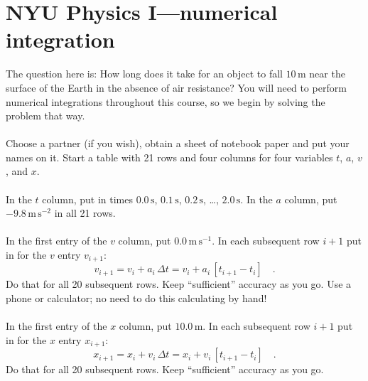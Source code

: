 \documentclass[12pt]{article}
\begin{document}
\newcommand{\m}{\mathrm{m}}
\newcommand{\s}{\mathrm{s}}
\newcommand{\mps}{\m\,\s^{-1}}
\newcommand{\mpss}{\m\,\s^{-2}}
\thispagestyle{empty}

\section*{NYU Physics I---numerical integration}

The question here is: How long does it take for an object to fall
$10\,\m$ near the surface of the Earth in the absence of air
resistance?  You will need to perform numerical integrations
throughout this course, so we begin by solving the problem that way.

\paragraph{\theproblem}%
Choose a partner (if you wish), obtain a sheet of notebook paper and
put your names on it.  Start a table with 21 rows and four columns for
four variables $t$, $a$, $v$, and $x$.

\paragraph{\theproblem}%
In the $t$ column, put in times $0.0\,\s$, $0.1\,\s$, $0.2\,\s$,
\ldots, $2.0\,\s$.  In the $a$ column, put $-9.8\,\mpss$ in all 21
rows.

\paragraph{\theproblem}%
In the first entry of the $v$ column, put $0.0\,\mps$.  In each
subsequent row $i+1$ put in for the $v$ entry $v_{i+1}$:
\begin{equation}
v_{i+1}= v_i + a_i\,\Delta t = v_i + a_i\,\left[t_{i+1}-t_i\right] \quad .
\end{equation}
Do that for all 20 subsequent rows.  Keep ``sufficient'' accuracy as
you go. Use a phone or calculator; no need to do this calculating by hand!

\paragraph{\theproblem}%
In the first entry of the $x$ column, put $10.0\,\m$.  In each
subsequent row $i+1$ put in for the $x$ entry $x_{i+1}$:
\begin{equation}
x_{i+1}= x_i + v_i\,\Delta t = x_i + v_i\,\left[t_{i+1}-t_i\right] \quad .
\end{equation}
Do that for all 20 subsequent rows.  Keep ``sufficient'' accuracy as
you go.
\end{document}
